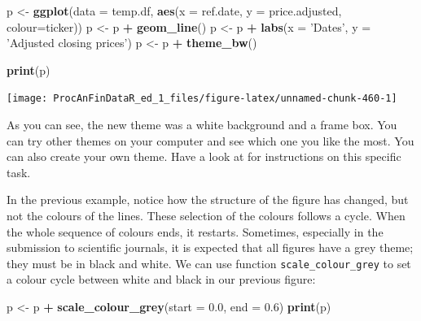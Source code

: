 \documentclass[11pt,]{book}
\newenvironment{Shaded}{\begin{snugshade}}{\end{snugshade}}
\newcommand{\KeywordTok}[1]{\textcolor[rgb]{0.27,0.27,0.27}{\textbf{#1}}}
\newcommand{\DataTypeTok}[1]{\textcolor[rgb]{0.27,0.27,0.27}{#1}}
\newcommand{\FloatTok}[1]{\textcolor[rgb]{0.06,0.06,0.06}{#1}}
\newcommand{\StringTok}[1]{\textcolor[rgb]{0.5,0.5,0.5}{#1}}
\newcommand{\OperatorTok}[1]{\textcolor[rgb]{0.81,0.36,0.00}{\textbf{#1}}}
\newcommand{\NormalTok}[1]{#1}
\begin{document}
\begin{Shaded}
\begin{Highlighting}[]
\NormalTok{p <-}\StringTok{ }\KeywordTok{ggplot}\NormalTok{(}\DataTypeTok{data =}\NormalTok{ temp.df, }\KeywordTok{aes}\NormalTok{(}\DataTypeTok{x =}\NormalTok{ ref.date, }
                                \DataTypeTok{y =}\NormalTok{ price.adjusted, }
                                \DataTypeTok{colour=}\NormalTok{ticker))}
\NormalTok{p <-}\StringTok{ }\NormalTok{p }\OperatorTok{+}\StringTok{ }\KeywordTok{geom_line}\NormalTok{()}
\NormalTok{p <-}\StringTok{ }\NormalTok{p }\OperatorTok{+}\StringTok{ }\KeywordTok{labs}\NormalTok{(}\DataTypeTok{x =} \StringTok{'Dates'}\NormalTok{, }\DataTypeTok{y =} \StringTok{'Adjusted closing prices'}\NormalTok{)}
\NormalTok{p <-}\StringTok{ }\NormalTok{p }\OperatorTok{+}\StringTok{ }\KeywordTok{theme_bw}\NormalTok{()}

\KeywordTok{print}\NormalTok{(p)}
\end{Highlighting}
\end{Shaded}

\begin{center}\texttt{[image: ProcAnFinDataR\_ed\_1\_files/figure-latex/unnamed-chunk-460-1]} \end{center}

As you can see, the new theme was a white background and a frame box.
You can try other themes on your computer and see which one you like the
most. You can also create your own theme. Have a look at
\citet{wickham2009ggplot2} for instructions on this specific task.

In the previous example, notice how the structure of the figure has
changed, but not the colours of the lines. These selection of the
colours follows a cycle. When the whole sequence of colours ends, it
restarts. Sometimes, especially in the submission to scientific
journals, it is expected that all figures have a grey theme; they must
be in black and white. We can use function \texttt{scale\_colour\_grey}
to set a colour cycle between white and black in our previous figure:

\begin{Shaded}
\begin{Highlighting}[]
\NormalTok{p <-}\StringTok{ }\NormalTok{p }\OperatorTok{+}\StringTok{ }\KeywordTok{scale_colour_grey}\NormalTok{(}\DataTypeTok{start =} \FloatTok{0.0}\NormalTok{, }\DataTypeTok{end =} \FloatTok{0.6}\NormalTok{)}
\KeywordTok{print}\NormalTok{(p)  }
\end{Highlighting}
\end{Shaded}
\end{document}
